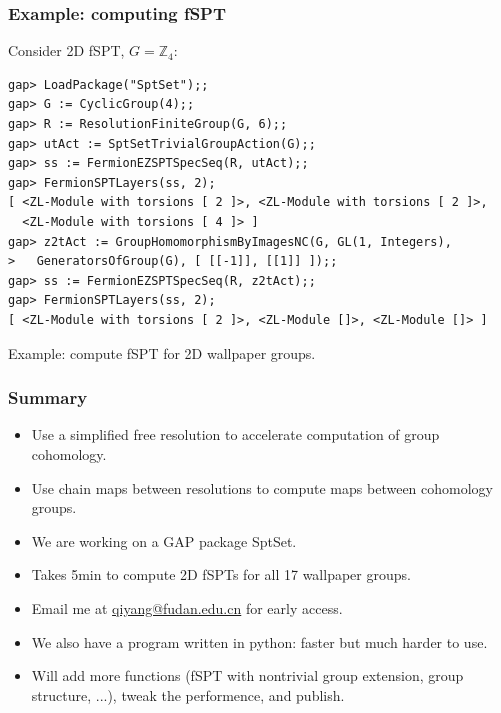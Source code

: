 \documentclass[xcolor=table, aspectratio=169]{beamer}
\begin{document}
\begin{frame}[fragile]
	\frametitle{Example: computing fSPT}
	Consider 2D fSPT, $G=\mathbb Z_4$:
\begin{lstlisting}[basicstyle=\footnotesize]
gap> LoadPackage("SptSet");;
gap> G := CyclicGroup(4);;
gap> R := ResolutionFiniteGroup(G, 6);;
gap> utAct := SptSetTrivialGroupAction(G);;
gap> ss := FermionEZSPTSpecSeq(R, utAct);;
gap> FermionSPTLayers(ss, 2);
[ <ZL-Module with torsions [ 2 ]>, <ZL-Module with torsions [ 2 ]>,
  <ZL-Module with torsions [ 4 ]> ]
gap> z2tAct := GroupHomomorphismByImagesNC(G, GL(1, Integers),
>   GeneratorsOfGroup(G), [ [[-1]], [[1]] ]);;
gap> ss := FermionEZSPTSpecSeq(R, z2tAct);;
gap> FermionSPTLayers(ss, 2);
[ <ZL-Module with torsions [ 2 ]>, <ZL-Module []>, <ZL-Module []> ]
\end{lstlisting}

Example: compute fSPT for 2D wallpaper groups.
\end{frame}

\begin{frame}
	\frametitle{Summary}
	\begin{itemize}
		\item Use a simplified free resolution to accelerate computation of group cohomology.
		\item Use chain maps between resolutions to compute maps between cohomology groups.
		\item We are working on a GAP package SptSet.
		\item Takes 5min to compute 2D fSPTs for all 17 wallpaper groups.
		\item Email me at \url{qiyang@fudan.edu.cn} for early access.
		\item We also have a program written in python: faster but much harder to use.
		\item Will add more functions (fSPT with nontrivial group extension, group structure, ...), tweak the performence, and publish.
	\end{itemize}
\end{frame}
\end{document}
